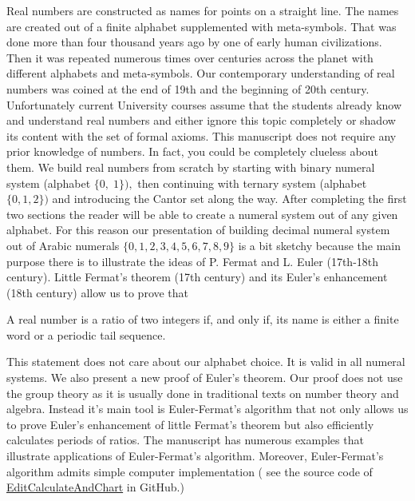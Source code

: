 \documentclass[color=black,11pt]{elegantpaper}
\begin{document}
 
   Real numbers are constructed as names for points on a straight line. The names are created out of a finite alphabet supplemented with meta-symbols. That was done more than four thousand years ago by one of early human civilizations. Then it was repeated numerous times over centuries across the planet with different alphabets and meta-symbols. Our contemporary understanding of real numbers was coined at the end of 19th and the beginning of 20th century. Unfortunately current University courses assume that the students already know and understand real numbers and either ignore this topic completely or shadow its content with the set of formal axioms. This manuscript does not require any prior knowledge of numbers. In fact, you could be completely clueless about them. We build real numbers from scratch by starting with binary numeral system (alphabet $\{0,\;1\}),$  then continuing with ternary system (alphabet $\{0,1,2\})$ and introducing the Cantor set along the way. After completing the first two sections the reader will be able to create a  numeral system  out of any given alphabet. For this reason our presentation of building decimal numeral system out of Arabic numerals $\{0,1,2,3,4,5,6,7,8,9\}$ is a bit sketchy because the main purpose there is to illustrate the ideas of P. Fermat and L. Euler (17th-18th century). Little Fermat's theorem (17th century) and its Euler's enhancement (18th century)  allow us to prove that\\
\begin{center}
\begin{itshape}
 A real number is a ratio of two integers if, and only if, its name is either a finite word or a periodic tail sequence.
\end{itshape}
\end{center} 
This statement does not care about our alphabet choice. It is valid in all numeral systems. We also present a new proof of Euler's theorem. Our proof does not use the group theory as it is usually done in traditional texts on number theory and algebra. Instead it's main tool is Euler-Fermat's algorithm that not only allows us to prove Euler's enhancement of little Fermat's theorem but also efficiently calculates periods of ratios. The manuscript has numerous examples that illustrate applications of Euler-Fermat's algorithm. Moreover, Euler-Fermat's algorithm admits simple computer implementation ( see the source code of \href{https://github.com/mathhobbit/EditCalculateAndChart}{EditCalculateAndChart} in GitHub.)\\ 
\end{document}
